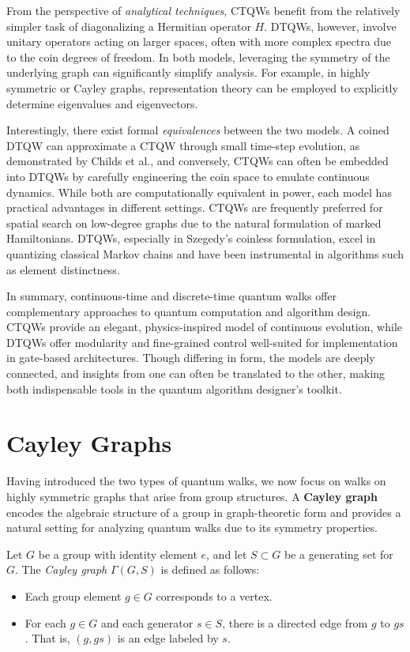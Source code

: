 \documentclass[12pt]{report}
\begin{document}
From the perspective of \textit{analytical techniques}, CTQWs benefit from the relatively simpler task of diagonalizing a Hermitian operator $H$. DTQWs, however, involve unitary operators acting on larger spaces, often with more complex spectra due to the coin degrees of freedom. In both models, leveraging the symmetry of the underlying graph can significantly simplify analysis. For example, in highly symmetric or Cayley graphs, representation theory can be employed to explicitly determine eigenvalues and eigenvectors.

Interestingly, there exist formal \textit{equivalences} between the two models. A coined DTQW can approximate a CTQW through small time-step evolution, as demonstrated by Childs et al., and conversely, CTQWs can often be embedded into DTQWs by carefully engineering the coin space to emulate continuous dynamics. While both are computationally equivalent in power, each model has practical advantages in different settings. CTQWs are frequently preferred for spatial search on low-degree graphs due to the natural formulation of marked Hamiltonians. DTQWs, especially in Szegedy’s coinless formulation, excel in quantizing classical Markov chains and have been instrumental in algorithms such as element distinctness.

In summary, continuous-time and discrete-time quantum walks offer complementary approaches to quantum computation and algorithm design. CTQWs provide an elegant, physics-inspired model of continuous evolution, while DTQWs offer modularity and fine-grained control well-suited for implementation in gate-based architectures. Though differing in form, the models are deeply connected, and insights from one can often be translated to the other, making both indispensable tools in the quantum algorithm designer’s toolkit.






\section{Cayley Graphs}



Having introduced the two types of quantum walks, we now focus on walks on highly symmetric graphs that arise from group structures. A \textbf{Cayley graph} encodes the algebraic structure of a group in graph-theoretic form and provides a natural setting for analyzing quantum walks due to its symmetry properties.

Let $G$ be a group with identity element $e$, and let $S \subset G$ be a generating set for $G$. The \emph{Cayley graph} $\Gamma(G,S)$ is defined as follows:
\begin{itemize}
    \item Each group element $g \in G$ corresponds to a vertex.
    \item For each $g \in G$ and each generator $s \in S$, there is a directed edge from $g$ to $gs$. That is, $(g, gs)$ is an edge labeled by $s$.
\end{itemize}
\end{document}
